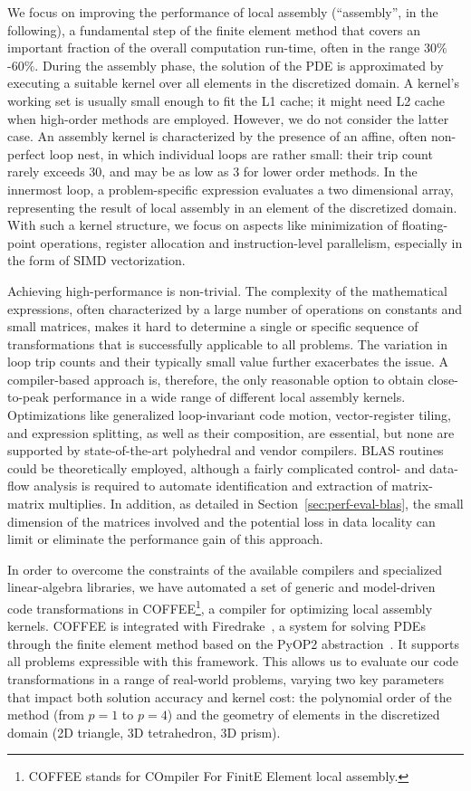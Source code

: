 \documentclass[conference]{IEEEtran}
\begin{document}
We focus on improving the performance of local assembly (``assembly'', in the following), a fundamental step of the finite element method that covers an important fraction of the overall computation run-time, often in the range 30$\%$-60$\%$. During the assembly phase, the solution of the PDE is approximated by executing a suitable kernel over all elements in the discretized domain. A kernel's working set is usually small enough to fit the L1 cache; it might need L2 cache when high-order methods are employed. However, we do not consider the latter case. An assembly kernel is characterized by the presence of an affine, often non-perfect loop nest, in which individual loops are rather small: their trip count rarely exceeds 30, and may be as low as 3 for lower order methods. In the innermost loop, a problem-specific expression evaluates a two dimensional array, representing the result of local assembly in an element of the discretized domain. With such a kernel structure, we focus on aspects like minimization of floating-point operations, register allocation and instruction-level parallelism, especially in the form of SIMD vectorization.

Achieving high-performance is non-trivial. The complexity of the mathematical expressions, often characterized by a large number of operations on constants and small matrices, makes it hard to determine a single or specific sequence of transformations that is successfully applicable to all problems. The variation in loop trip counts and their typically small value further exacerbates the issue. A compiler-based approach is, therefore, the only reasonable option to obtain close-to-peak performance in a wide range of different local assembly kernels. Optimizations like generalized loop-invariant code motion, vector-register tiling, and expression splitting, as well as their composition, are essential, but none are supported by state-of-the-art polyhedral and vendor compilers. BLAS routines could be theoretically employed, although a fairly complicated control- and data-flow analysis is required to automate identification and extraction of matrix-matrix multiplies. In addition, as detailed in Section~\ref{sec:perf-eval-blas}, the small dimension of the  matrices involved and the potential loss in data locality can limit or eliminate the performance gain of this approach.

In order to overcome the constraints of the available compilers and specialized linear-algebra libraries, we have automated a set of generic and model-driven code transformations in COFFEE\footnote{COFFEE stands for COmpiler For FinitE Element local assembly.}, a compiler for optimizing local assembly kernels. COFFEE is integrated with Firedrake~\cite{firedrake-code}, a system for solving PDEs through the finite element method based on the PyOP2 abstraction~\cite{pyop2isc}. It supports all problems expressible with this framework. This allows us to evaluate our code transformations in a range of real-world problems, varying two key parameters that impact both solution accuracy and kernel cost: the polynomial order of the method (from $p=1$ to $p=4$) and the geometry of elements in the discretized domain (2D triangle, 3D tetrahedron, 3D prism).
\end{document}
